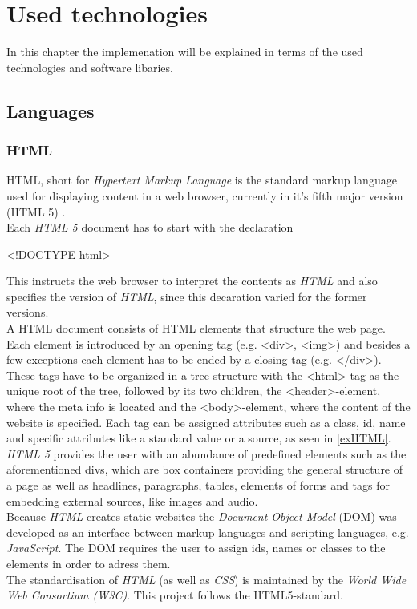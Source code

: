 
\chapter{Used technologies}
  \label{technologies}

In this chapter the implemenation will be explained in terms of the used technologies and software libaries.
\section{Languages}
\subsection{HTML}
HTML, short for \textit{Hypertext Markup Language} is the standard markup language used for displaying content in a web browser, currently in it's fifth major version (HTML 5) \cite{w3c,wiki-html}.\\
Each \textit{HTML 5} document has to start with the declaration 
\begin{center}
\textless !DOCTYPE html\textgreater
\end{center}
This instructs the web browser to interpret the contents as \textit{HTML} and also specifies the version of \textit{HTML}, since this decaration varied for the former versions.\\
A HTML document consists of HTML elements that structure the web page. Each element is introduced by an opening tag (e.g. \textless div\textgreater, \textless img\textgreater) and besides a few exceptions each element has to be ended by a closing tag (e.g. \textless /div\textgreater). These tags have to be organized in a tree structure with the \textless html\textgreater-tag as the unique root of the tree, followed by its two children, the \textless header\textgreater-element, where the meta info is located and the \textless body\textgreater-element, where the content of the website is specified. Each tag can be assigned attributes such as a class, id, name and specific attributes like a standard value or a source, as seen in \autoref{exHTML}.\\
\textit{HTML 5} provides the user with an abundance of predefined elements such as the aforementioned divs, which are box containers providing the general structure of a page as well as headlines, paragraphs, tables, elements of forms and tags for embedding external sources, like images and audio.\\
Because \textit{HTML} creates static websites the \textit{Document Object Model} (DOM) was developed as an interface between markup languages and scripting languages, e.g. \textit{JavaScript}. The DOM requires the user to assign ids, names or classes to the elements in order to adress them. \\
The standardisation of \textit{HTML} (as well as \textit{CSS}) is maintained by the \textit{World Wide Web Consortium (W3C)}. This project follows the HTML5-standard.

